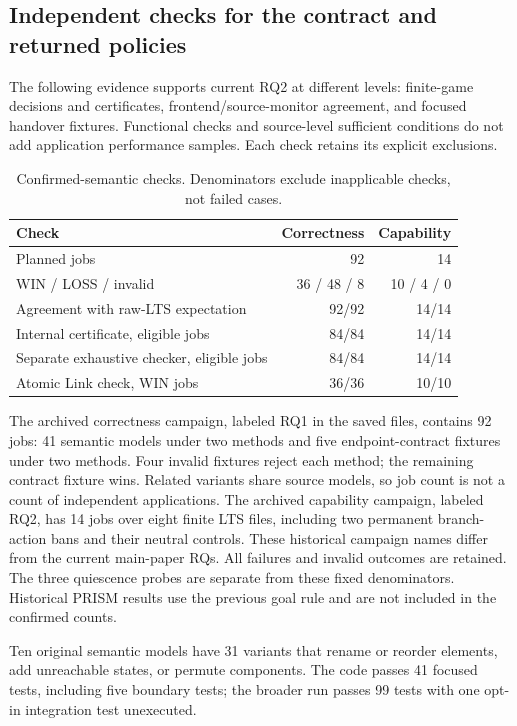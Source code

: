 \documentclass[11pt]{article}
\begin{document}
\clearpage
\subsection{Independent checks for the contract and returned policies}
\label{supp:independent-checks}
The following evidence supports current RQ2 at different levels: finite-game decisions and certificates, frontend/source-monitor agreement, and focused handover fixtures. Functional checks and source-level sufficient conditions do not add application performance samples. Each check retains its explicit exclusions.

\begin{table}[ht]
\centering\small
\caption{Confirmed-semantic checks. Denominators exclude inapplicable checks, not failed cases.}
\begin{tabular}{@{}lrr@{}}
\toprule
Check & Correctness & Capability\\
\midrule
Planned jobs & 92 & 14\\
WIN / LOSS / invalid & 36 / 48 / 8 & 10 / 4 / 0\\
Agreement with raw-LTS expectation & 92/92 & 14/14\\
Internal certificate, eligible jobs & 84/84 & 14/14\\
Separate exhaustive checker, eligible jobs & 84/84 & 14/14\\
Atomic Link check, WIN jobs & 36/36 & 10/10\\
\bottomrule
\end{tabular}
\end{table}
The archived correctness campaign, labeled RQ1 in the saved files, contains 92 jobs: 41 semantic models under two methods and five endpoint-contract fixtures under two methods. Four invalid fixtures reject each method; the remaining contract fixture wins. Related variants share source models, so job count is not a count of independent applications. The archived capability campaign, labeled RQ2, has 14 jobs over eight finite LTS files, including two permanent branch-action bans and their neutral controls. These historical campaign names differ from the current main-paper RQs. All failures and invalid outcomes are retained. The three quiescence probes are separate from these fixed denominators. Historical PRISM results use the previous goal rule and are not included in the confirmed counts.

Ten original semantic models have 31 variants that rename or reorder elements, add unreachable states, or permute components. The code passes 41 focused tests, including five boundary tests; the broader run passes 99 tests with one opt-in integration test unexecuted.
\end{document}
